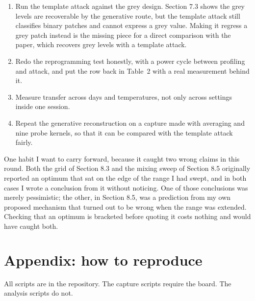 \documentclass[11pt,a4paper]{article}
\begin{document}
\begin{enumerate}
      whether clocking the accelerator faster is a real countermeasure, which is the
      cheapest defence anyone would try.
\item Run the template attack against the grey design. Section 7.3 shows the grey
      levels are recoverable by the generative route, but the template attack still
      classifies binary patches and cannot express a grey value. Making it regress a
      grey patch instead is the missing piece for a direct comparison with the paper,
      which recovers grey levels with a template attack.
\item Redo the reprogramming test honestly, with a power cycle between profiling and
      attack, and put the row back in Table~2 with a real measurement behind it.
\item Measure transfer across days and temperatures, not only across settings inside one
      session.
\item Repeat the generative reconstruction on a capture made with averaging and nine
      probe kernels, so that it can be compared with the template attack fairly.
\end{enumerate}

One habit I want to carry forward, because it caught two wrong claims in this round. Both
the grid of Section 8.3 and the mixing sweep of Section 8.5 originally reported an optimum
that sat on the edge of the range I had swept, and in both cases I wrote a conclusion from
it without noticing. One of those conclusions was merely pessimistic; the other, in
Section 8.5, was a prediction from my own proposed mechanism that turned out to be wrong
when the range was extended. Checking that an optimum is bracketed before quoting it costs
nothing and would have caught both.

\section*{Appendix: how to reproduce}

All scripts are in the repository. The capture scripts require the board. The analysis
scripts do not.
\end{document}
